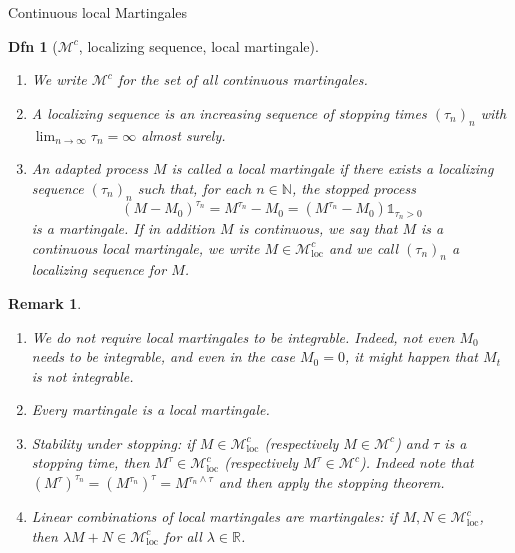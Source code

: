 \documentclass[a4paper]{article}
\theoremstyle{mytheoremstyle}
\newtheorem{definition}{Dfn}
\newtheorem*{remark}{Remark}
\newcommand{\1}{\mathds{1}}
\begin{document}
\begin{multicols*}{3}
\begin{roundbox}{Continuous local Martingales}
\begin{definition}[$\mathcal{M}^c$, localizing sequence, local martingale]
  \begin{enumerate}[parsep=0.1em]
    \item We write $\mathcal{M}^c$ for the set of all continuous martingales.
    
    \item A {\emph{localizing sequence}} is an increasing sequence of stopping
    times $(\tau_n)_n$ with $\lim_{n \rightarrow \infty} \tau_n = \infty$
    almost surely.
    
    \item An adapted process $M$ is called a {\emph{local martingale}} if
    there exists a localizing sequence $(\tau_n)_n$ such that, for each $n \in
    \mathbb{N}$, the stopped process
    \[ (M - M_0)^{\tau_n} = M^{\tau_n} - M_0 = (M^{\tau_n} - M_0)
       \1_{\tau_n > 0} \]
    is a martingale. If in addition $M$ is continuous, we say that $M$ is a
    {\emph{continuous local martingale}}, we write $M \in
    \mathcal{M}^c_{\operatorname{loc}}$ and we call $(\tau_n)_n$ a {\emph{localizing
    sequence for }}$M$.
  \end{enumerate}
\end{definition}

\begin{remark}
  \label{rem:first.properties.local.mart}
  \begin{enumerate}[parsep=0.25em]
    \item We do not require local martingales to be integrable. Indeed, not
    even $M_0$ needs to be integrable, and even in the case $M_0 = 0$, it
    might happen that $M_t$ is not integrable.
    
    \item Every martingale is a local martingale.

    \item {\emph{Stability under stopping}}: if $M \in
    \mathcal{M}^c_{\operatorname{loc}}$ (respectively $M \in \mathcal{M}^c$) and
    $\tau$ is a stopping time, then $M^{\tau} \in \mathcal{M}^c_{\operatorname{loc}}$
    (respectively $M^{\tau} \in \mathcal{M}^c$). Indeed note that
    $(M^{\tau})^{\tau_n} = (M^{\tau_n})^{\tau} = M^{\tau_n \wedge \tau}$ and
    then apply the stopping theorem.

    \item Linear combinations of local martingales are martingales: if $M, N
    \in \mathcal{M}^c_{\operatorname{loc}}$, then $\lambda M + N \in
    \mathcal{M}^c_{\operatorname{loc}}$ for all $\lambda \in \mathbb{R}$.


\end{enumerate}
\end{remark}
\end{roundbox}
\end{multicols*}
\end{document}
